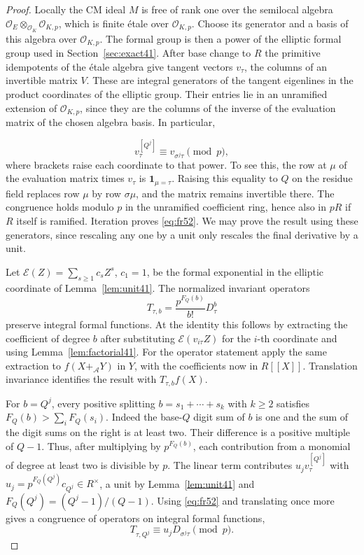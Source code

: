 \documentclass[a4paper,11pt]{article}
\theoremstyle{definition}
\theoremstyle{remark}
\numberwithin{equation}{section}
\newcommand{\OO}{\mathcal O}
\begin{document}
\begin{proof}
Locally the CM ideal \(M\) is free of rank one over the semilocal
algebra \(\OO_E\otimes_{\OO_K}\OO_{K,p}\), which is finite \'etale
over \(\OO_{K,p}\). Choose its generator and a basis of this algebra
over \(\OO_{K,p}\). The formal group is then a power of the elliptic
formal group used in Section~\ref{sec:exact41}. After base change to
\(R\) the primitive idempotents of the \'etale algebra give tangent
vectors \(v_\tau\), the columns of an invertible matrix \(V\).
These are integral generators of the tangent eigenlines in the product
coordinates of the elliptic group. Their entries lie in an unramified
extension of \(\OO_{K,p}\), since they are the columns of the inverse
of the evaluation matrix of the chosen algebra basis. In particular,

\begin{equation}
                        v_\tau^{[Q^j]}\equiv v_{\sigma^j\tau}\pmod p,
                                                              \label{eq:fr52}
\end{equation}
where brackets raise each coordinate to that power. To see this,
the row at \(\mu\) of the evaluation matrix times \(v_\tau\) is
\(\mathbf1_{\mu=\tau}\). Raising this equality to \(Q\) on the
residue field replaces row \(\mu\) by row \(\sigma\mu\), and the
matrix remains invertible there. The congruence holds modulo \(p\) in the
unramified coefficient ring, hence also in \(pR\) if \(R\) itself is
ramified. Iteration proves \eqref{eq:fr52}. We may prove the result
using these generators, since rescaling any one by a unit only rescales
the final derivative by a unit.

Let \(\mathcal E(Z)=\sum_{s\ge1}c_s Z^s\), \(c_1=1\), be the formal
exponential in the elliptic coordinate of Lemma~\ref{lem:unit41}.
The normalized invariant operators
\[
          T_{\tau,b}=\frac{p^{F_Q(b)}}{b!}D_\tau^b
\]
preserve integral formal functions. At the identity this follows
by extracting the coefficient of degree \(b\) after substituting
\(\mathcal E(v_{i\tau}Z)\) for the \(i\)-th coordinate and using
Lemma~\ref{lem:factorial41}. For the operator statement apply the
same extraction to \(f(X+_{\mathcal A}Y)\) in \(Y\), with the
coefficients now in \(R[[X]]\). Translation invariance identifies
the result with \(T_{\tau,b}f(X)\).

For \(b=Q^j\), every positive splitting \(b=s_1+\cdots+s_k\) with
\(k\ge2\) satisfies \(F_Q(b)>\sum_iF_Q(s_i)\). Indeed the base-\(Q\)
digit sum of \(b\) is one and the sum of the digit sums on the
right is at least two. Their difference is a positive multiple of
\(Q-1\). Thus, after multiplying by \(p^{F_Q(b)}\), each contribution
from a monomial of degree at least two is divisible by \(p\).
The linear term contributes \(u_j v_\tau^{[Q^j]}\) with
\(u_j=p^{F_Q(Q^j)}c_{Q^j}\in R^\times\), a unit by
Lemma~\ref{lem:unit41} and \(F_Q(Q^j)=(Q^j-1)/(Q-1)\).
Using \eqref{eq:fr52} and translating once more gives a congruence
of operators on integral formal functions,
\begin{equation}
                T_{\tau,Q^j}\equiv u_j D_{\sigma^j\tau}\pmod {p}.
                                                               \label{eq:op52}
\end{equation}


\end{proof}
\end{document}
